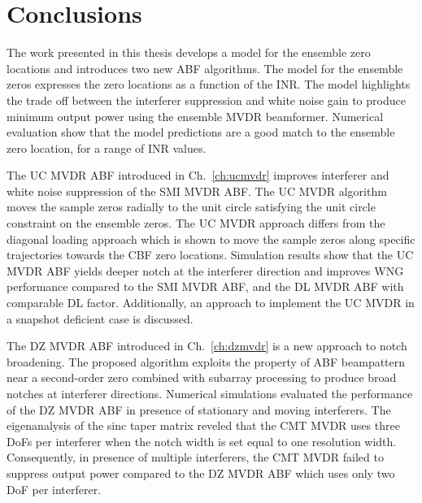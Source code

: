 
\chapter{Conclusions}
\label{ch:conclusion}
The work presented in this thesis develops a model for the ensemble
zero locations and introduces two new ABF algorithms. The model for
the ensemble zeros expresses the zero locations as a function of the
INR. The model highlights the trade off between the interferer
suppression and white noise gain to produce minimum output power using
the ensemble MVDR beamformer. Numerical evaluation show that the model
predictions are a good match to the ensemble zero location, for a
range of INR values.

The UC MVDR ABF introduced in Ch.~\ref{ch:ucmvdr} improves interferer
and white noise suppression of the SMI MVDR ABF. The UC MVDR algorithm
moves the sample zeros radially to the unit circle satisfying the unit
circle constraint on the ensemble zeros. The UC MVDR approach differs
from the diagonal loading approach which is shown to move the sample
zeros along specific trajectories towards the CBF zero
locations. Simulation results show that the UC MVDR ABF yields deeper
notch at the interferer direction and improves WNG performance
compared to the SMI MVDR ABF, and the DL MVDR ABF with comparable DL
factor. Additionally, an approach to implement the UC MVDR in a
snapshot deficient case is discussed. %

The DZ MVDR ABF introduced in Ch.~\ref{ch:dzmvdr} is a new approach to
notch broadening. The proposed algorithm exploits the property of ABF
beampattern near a second-order zero combined with subarray processing
to produce broad notches at interferer directions. Numerical
simulations evaluated the performance of the DZ MVDR ABF in presence
of stationary and moving interferers. The eigenanalysis of the sinc
taper matrix reveled that the CMT MVDR uses three DoFs per interferer
when the notch width is set equal to one resolution
width. Consequently, in presence of multiple interferers, the CMT MVDR
failed to suppress output power compared to the DZ MVDR ABF which uses
only two DoF per interferer.

